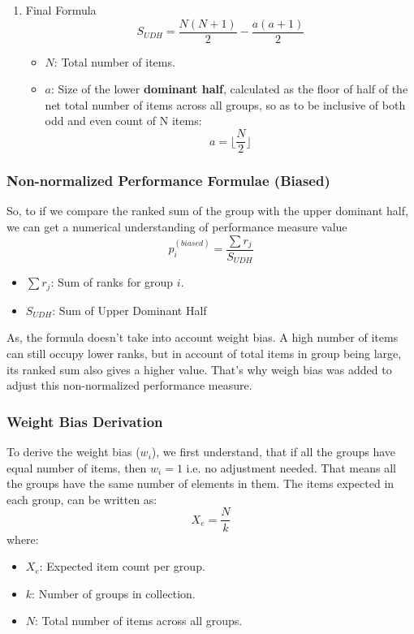 \documentclass[man,floatsintext]{apa7}
\begin{document}
\begin{enumerate}
\item{Final Formula}
\begin{equation}
\label{eq:SUDH}
S_{UDH} = \frac{N(N + 1)}{2} - \frac{a(a+1)}{2}
\end{equation}

\begin{itemize}
  \item \( N \): Total number of items.
  \item \( a \): Size of the lower \textbf{dominant half}, calculated as the floor of half of the net total number of items across all groups, so as to be inclusive of both odd and even count of N items:
  \begin{equation}
  a = \lfloor \frac{N}{2} \rfloor
  \end{equation}
\end{itemize}
\end{enumerate}

\subsubsection*{Non-normalized Performance Formulae (Biased)}
So, to if we compare the ranked sum of the group with the upper dominant half, we can get a numerical understanding of performance measure value
\begin{equation}
\label{eq:p-biased}
    p_i^{(biased)} = \frac{\sum r_j}{ S_{UDH} }
\end{equation}
\begin{itemize}
    \item \textbf{$\sum r_j$}: Sum of ranks for group $i$.
    \item \textbf{$S_{UDH}$}: Sum of Upper Dominant Half
\end{itemize}

As, the formula doesn't take into account weight bias. A high number of items can still occupy lower ranks, but in account of total items in group being large, its ranked sum also gives a higher value. That's why weigh bias was added to adjust this non-normalized performance measure.

\subsubsection*{Weight Bias Derivation}
To derive the weight bias ($w_i$), we first understand, that if all the groups have equal number of items, then $w_i = 1$ i.e. no adjustment needed. That means all the groups have the same number of elements in them. The items expected in each group, can be written as:
\begin{equation}
X_e = \frac{N}{k}
\end{equation}
where:
\begin{itemize}
    \item $X_e$: Expected item count per group.
    \item $k$: Number of groups in collection.
    \item $N$: Total number of items across all groups.
\end{itemize}
\end{document}
